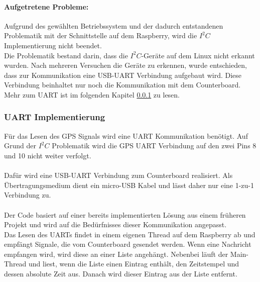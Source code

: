 \paragraph{Aufgetretene Probleme:}
Aufgrund des gewählten Betriebssystem und der dadurch entstandenen Problematik mit der Schnittstelle auf dem Raspberry, wird die $I^2C$ Implementierung nicht beendet.\\
Die Problematik bestand darin, dass die $I^2C$-Geräte auf dem Linux nicht erkannt wurden. Nach mehreren Versuchen die Geräte zu erkennen, wurde entschieden, dass zur Kommunikation eine USB-UART Verbindung aufgebaut wird. Diese Verbindung beinhaltet nur noch die Kommunikation mit dem Counterboard. Mehr zum UART ist im folgenden Kapitel \ref{sec:uart} zu lesen.

\clearpage
\subsubsection{UART Implementierung}\label{sec:uart}%
Für das Lesen des GPS Signals wird eine UART Kommunikation benötigt.
Auf Grund der $I^2C$ Problematik wird die GPS UART Verbindung auf den zwei Pins 8 und 10 nicht weiter verfolgt.\\
\\
Dafür wird eine USB-UART Verbindung zum Counterboard realisiert. Als Übertragungsmedium dient ein micro-USB Kabel und lässt daher nur eine 1-zu-1 Verbindung zu.\\
\\
Der Code basiert auf einer bereits implementierten Lösung aus einem früheren Projekt und wird auf die Bedürfnisses dieser Kommunikation angepasst.\\
Das Lesen des UARTs findet in einem eigenen Thread auf dem Raspberry ab und empfängt Signale, die vom Counterboard gesendet werden. Wenn eine Nachricht empfangen wird, wird diese an einer Liste angehängt. Nebenbei läuft der Main-Thread und liest, wenn die Liste einen Eintrag enthält, den Zeitstempel und dessen absolute Zeit aus. Danach wird dieser Eintrag aus der Liste entfernt.